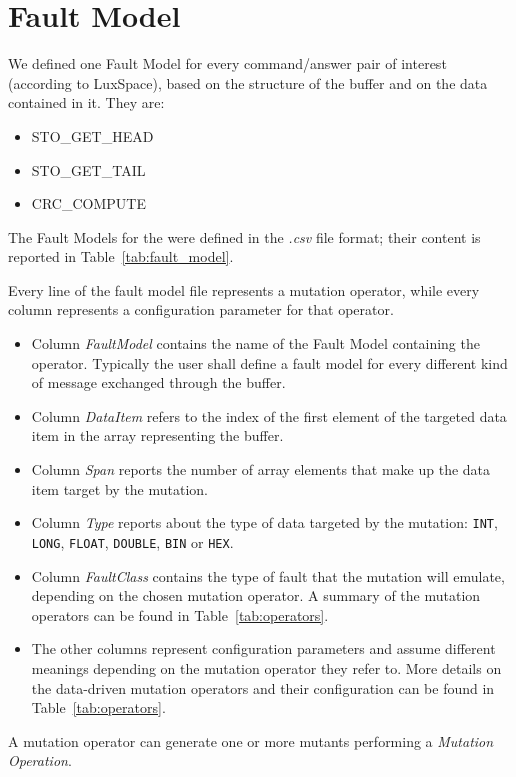 \section{Fault Model}
We defined one Fault Model for every command/answer pair of interest (according to LuxSpace), based on the structure of the buffer and on the data contained in it.
They are:
\begin{itemize}
\item STO\_GET\_HEAD
\item STO\_GET\_TAIL
\item CRC\_COMPUTE
\end{itemize}

The Fault Models for the \case were defined in the \emph{.csv} file format; their content is reported in Table~\ref{tab:fault_model}.



Every line of the fault model file represents a mutation operator, while every column represents a configuration parameter for that operator.

\begin{itemize}
  \item Column \emph{FaultModel} contains the name of the Fault Model containing the operator. Typically the user shall define a fault model for every different kind of message exchanged through the buffer.

  \item Column \emph{DataItem} refers to the index of the first element of the targeted data item in the array representing the buffer.

  \item Column \emph{Span} reports the number of array elements that make up the data item target by the mutation.

  \item Column \emph{Type} reports about the type of data targeted by the mutation: \texttt{INT}, \texttt{LONG}, \texttt{FLOAT}, \texttt{DOUBLE}, \texttt{BIN} or \texttt{HEX}.

  \item Column \emph{FaultClass} contains the type of fault that the mutation will emulate, depending on the chosen mutation operator. A summary of the mutation operators can be found in Table~\ref{tab:operators}.

  \item The other columns represent configuration parameters and assume different meanings depending on the mutation operator they refer to. More details on the data-driven mutation operators and their configuration can be found in Table~\ref{tab:operators}.

\end{itemize}



A mutation operator can generate one or more mutants performing a \emph{Mutation Operation}.
